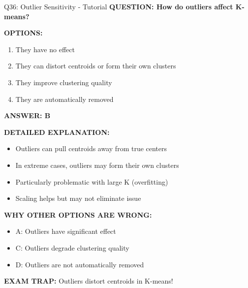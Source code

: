 \documentclass[8pt]{beamer}
\begin{document}
	\begin{frame}{Q36: Outlier Sensitivity - Tutorial}
		\fontsize{6.5}{7.5}\selectfont
		\textbf{QUESTION: How do outliers affect K-means?}
		
		\vspace{0.1cm}
		\textbf{OPTIONS:}
		\begin{enumerate}
			\item They have no effect
			\item They can distort centroids or form their own clusters
			\item They improve clustering quality
			\item They are automatically removed
		\end{enumerate}
		
		\vspace{0.1cm}
		\textcolor{myblue}{\textbf{ANSWER: B}}
		
		\vspace{0.1cm}
		\textbf{DETAILED EXPLANATION:}
		\begin{itemize}
			\item Outliers can pull centroids away from true centers
			\item In extreme cases, outliers may form their own clusters
			\item Particularly problematic with large K (overfitting)
			\item Scaling helps but may not eliminate issue
		\end{itemize}
		
		\vspace{0.1cm}
		\textcolor{myred}{\textbf{WHY OTHER OPTIONS ARE WRONG:}}
		\begin{itemize}
			\item \textcolor{myred}{A:} Outliers have significant effect
			\item \textcolor{myred}{C:} Outliers degrade clustering quality
			\item \textcolor{myred}{D:} Outliers are not automatically removed
		\end{itemize}
		
		\textcolor{myred}{\textbf{EXAM TRAP:}} Outliers \textcolor{myblue}{distort centroids} in K-means!
	\end{frame}
	
\end{document}
